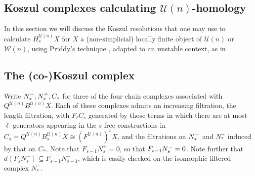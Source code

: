 \documentclass[11pt]{amsart}
\theoremstyle{plain}
\theoremstyle{definition}
\newcommand{\calU}{\mathcal{U}}
\newcommand{\calw}{\mathcal{W}}
\theoremstyle{plain}
\newcommand{\Nop}{N^{\smash{-}}}
\begin{document}
\begin{Koszul complexes}

\section{\textbf{Koszul complexes calculating $\calU(n)$-homology}}
In this section we will discuss the Koszul resolutions that one may use to calculate $H_*^{\calU(n)}X$ for $X$ a (non-simplicial) locally finite object of $\calU(n)$ or $\calw(n)$, using Priddy's technique \cite{PriddyKoszul.pdf}, adapted to an unstable context, as in \cite{CurtisSimplicialHtpy.pdf}.

\subsection{The (co-)Koszul complex}
Write $\Nop_*,N_*^\div,C_*$ for three of the four chain complexes associated with $Q^{\calU(n)}B^{\calU(n)}X$. Each of these complexes admits an increasing filtration, the length filtration, with $F_\ell C_s$ generated by those terms in which there are at most $\ell$ generators appearing in the $s$ free constructions in $C_s= Q^{\calU(n)}B^{\calU(n)}_sX\cong (F^{\calU(n)})^sX$, and the filtrations on $\Nop_*$ and $N^\div_*$ induced by that on $C_*$. Note that $F_{s-1}N^\div_s=0$, so that  $F_{s-1}\Nop_s=0$. Note further that $d(F_sN_s^-)\subseteq F_{s-1}N_{s-1}^-$, which is easily checked on the isomorphic filtered complex $N_*^\div$.


\end{Koszul complexes}
\end{document}
